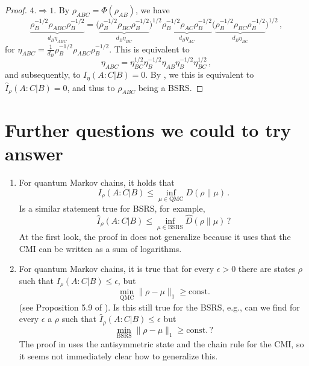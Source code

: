 \documentclass[11pt]{article}
\theoremstyle{newdefinition}
\theoremstyle{newplain}
\theoremstyle{myplain}
\DeclareMathOperator{\1}{\mathds{1}}
\begin{document}
{\begin{proof}
     \vspace{0.2cm}
     
\noindent \underline{$4. \Rightarrow 1. $} By $\rho_{ABC}= \Phi(\rho_{AB}) $, we have 
\begin{equation}
    \underbrace{\rho_B^{-1/2} \rho_{ABC} \rho_B^{-1/2}}_{d_B \eta_{ABC}}   = \Big( \underbrace{ \rho_B^{-1/2}\rho_{BC}\rho_B^{-1/2}   }_{d_B \eta_{BC}}\Big)^{1/2} \underbrace{\rho_B^{-1/2}\rho_{AC}\rho_B^{-1/2} }_{d_B \eta_{AC}}\Big( \underbrace{ \rho_B^{-1/2}\rho_{BC}\rho_B^{-1/2} }_{d_B \eta_{BC}}  \Big)^{1/2} \, ,
\end{equation}
for $\eta_{ABC} = \frac{1}{d_B} \rho_B^{-1/2} \rho_{ABC} \rho_B^{-1/2}$. This is equivalent to
\begin{equation}
    \eta_{ABC} = \eta_{BC}^{1/2} \eta_{B}^{-1/2}  \eta_{AB} \eta_{B}^{-1/2} \eta_{BC}^{1/2} \, , 
\end{equation}
and subsequently, to $I_\eta (A:C | B) = 0$. By , we this is equivalent to $\widehat{I}_\rho (A:C |B)= 0$, and thus to $\rho_{ABC}$ being a BSRS.
    
\end{proof}

\section{Further questions we could to try answer}

\begin{enumerate}
    \item For quantum Markov chains, it holds that \cite[Lemma 5.12]{sutter2018approximate}
    \begin{equation} \label{eq:upper-bounds_CMI-distance-to-QMC}
        I_\rho(A:C|B) \leq \inf_{\mu \in \mathrm{QMC}} D(\rho\|\mu)\, .
    \end{equation}
    Is a similar statement true for BSRS, for example,
    \begin{equation}
        \hat I_\rho(A:C|B) \leq \inf_{\mu \in \mathrm{BSRS}} \hat D(\rho\|\mu)\, ?
    \end{equation}
    At the first look, the proof in \cite{sutter2018approximate} does not generalize because it uses that the CMI can be written as a sum of logarithms.
    
    \item For quantum Markov chains, it is true that for every $\epsilon > 0$ there are states $\rho$ such that $I_\rho(A:C|B) \leq \epsilon$, but 
    \begin{equation}
        \min_{\mathrm{QMC}} \|\rho - \mu\|_1 \geq \mathrm{const.}
    \end{equation}
    (see Proposition 5.9 of \cite{sutter2018approximate}). Is this still true for the BSRS, e.g., can we find for every $\epsilon$ a $\rho$ such that $\widehat I_\rho(A:C|B) \leq \epsilon$ but 
       \begin{equation}
        \min_{\mathrm{BSRS}} \|\rho - \mu\|_1 \geq \mathrm{const.} \, ?
    \end{equation}
    The proof in \cite{sutter2018approximate} uses the antisymmetric state and the chain rule for the CMI, so it seems not immediately clear how to generalize this.


\end{enumerate}}
\end{document}
